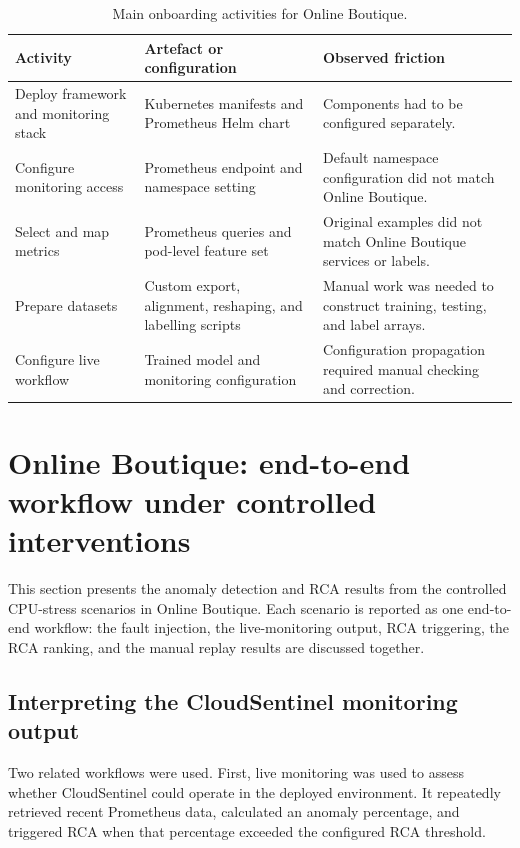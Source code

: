 \begin{table}[htbp]
    \centering
    \small
    \caption{Main onboarding activities for Online Boutique.}
    \label{tab:online_boutique_onboarding}
    \begin{tabular}{p{} p{} p{}}
        \toprule
        \textbf{Activity} & \textbf{Artefact or configuration} & \textbf{Observed friction} \\
        \midrule
        Deploy framework and monitoring stack & Kubernetes manifests and Prometheus Helm chart & Components had to be configured separately. \\
        Configure monitoring access & Prometheus endpoint and namespace setting & Default namespace configuration did not match Online Boutique. \\
        Select and map metrics & Prometheus queries and pod-level feature set & Original examples did not match Online Boutique services or labels. \\
        Prepare datasets & Custom export, alignment, reshaping, and labelling scripts & Manual work was needed to construct training, testing, and label arrays. \\
        Configure live workflow & Trained model and monitoring configuration & Configuration propagation required manual checking and correction. \\
        \bottomrule
    \end{tabular}
\end{table}

\section{Online Boutique: end-to-end workflow under controlled interventions}
This section presents the anomaly detection and RCA results from the controlled CPU-stress scenarios in Online Boutique. Each scenario is reported as one end-to-end workflow: the fault injection, the live-monitoring output, RCA triggering, the RCA ranking, and the manual replay results are discussed together.

\subsection{Interpreting the CloudSentinel monitoring output}
Two related workflows were used. First, live monitoring was used to assess whether CloudSentinel could operate in the deployed environment. It repeatedly retrieved recent Prometheus data, calculated an anomaly percentage, and triggered RCA when that percentage exceeded the configured RCA threshold.

